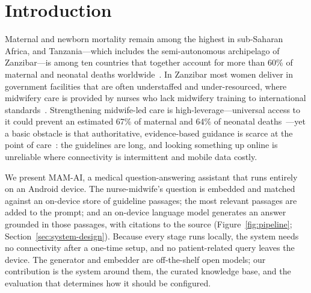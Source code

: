 \section{Introduction}
\label{sec:intro}

Maternal and newborn mortality remain among the highest in sub-Saharan
Africa, and Tanzania---which includes the semi-autonomous archipelago of
Zanzibar---is among ten countries that together account for more than 60\% of
maternal and neonatal deaths worldwide~\cite{bohle2025mamai}. In Zanzibar most
women deliver in government facilities that are often understaffed and
under-resourced, where midwifery care is provided by nurses who lack
midwifery training to international standards~\cite{bohle2025mamai}.
Strengthening midwife-led care is high-leverage---universal access to it
could prevent an estimated 67\% of maternal and 64\% of neonatal
deaths~\cite{nove2021midwives}---yet a basic obstacle is that authoritative,
evidence-based guidance is scarce at the point of care~\cite{swisstph2024mamai}:
the guidelines are long, and looking something up online is unreliable where
connectivity is intermittent and mobile data costly.

We present MAM-AI, a medical question-answering assistant that runs entirely
on an Android device. The nurse-midwife's question is embedded and matched
against an on-device store of guideline passages; the most relevant passages
are added to the prompt; and an on-device language model generates an answer
grounded in those passages, with citations to the source
(Figure~\ref{fig:pipeline}; Section~\ref{sec:system-design}). Because every
stage runs locally, the system needs no connectivity after a one-time setup,
and no patient-related query leaves the device. The generator and embedder
are off-the-shelf open models; our contribution is the system around them,
the curated knowledge base, and the evaluation that determines how it should
be configured.

